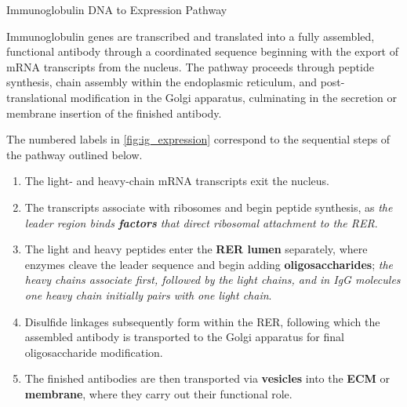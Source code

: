       \begin{core}{Immunoglobulin DNA to Expression Pathway}

        Immunoglobulin genes are transcribed and translated into a fully assembled, functional antibody through a coordinated sequence beginning with the export of mRNA transcripts from the nucleus. The pathway proceeds through peptide synthesis, chain assembly within the endoplasmic reticulum, and post-translational modification in the Golgi apparatus, culminating in the secretion or membrane insertion of the finished antibody.


        The numbered labels in \autoref{fig:ig_expression} correspond to the sequential steps of the pathway outlined below.

        \begin{enumerate}[label=(\arabic*)]

          \item The light- and heavy-chain mRNA transcripts exit the nucleus.

          \item The transcripts associate with ribosomes and begin peptide synthesis, as \textit{the leader region binds \textbf{factors} that direct ribosomal attachment to the RER}.

          \item The light and heavy peptides enter the \textbf{RER lumen} separately, where enzymes cleave the leader sequence and begin adding \textbf{oligosaccharides}; \textit{the heavy chains associate first, followed by the light chains, and in IgG molecules one heavy chain initially pairs with one light chain}.

          \item Disulfide linkages subsequently form within the RER, following which the assembled antibody is transported to the Golgi apparatus for final oligosaccharide modification.

          \item The finished antibodies are then transported via \textbf{vesicles} into the \textbf{ECM} or \textbf{membrane}, where they carry out their functional role.

        \end{enumerate}

      \end{core}

